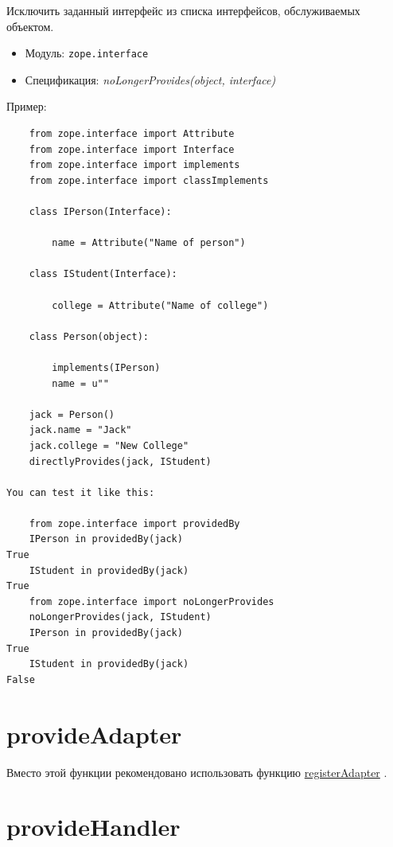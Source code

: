\documentclass[a4paper,openany,twoside,draft]{book}
\providecommand*{\DUroletitlereference}[1]{\textsl{#1}}
\begin{document}
Исключить заданный интерфейс из списка интерфейсов, обслуживаемых объектом.

\begin{itemize}

\item Модуль: \texttt{zope.interface}

\item Спецификация: \DUroletitlereference{noLongerProvides(object, interface)}

\end{itemize}

Пример:

\begin{verbatim}
    from zope.interface import Attribute
    from zope.interface import Interface
    from zope.interface import implements
    from zope.interface import classImplements

    class IPerson(Interface):

        name = Attribute("Name of person")

    class IStudent(Interface):

        college = Attribute("Name of college")

    class Person(object):

        implements(IPerson)
        name = u""

    jack = Person()
    jack.name = "Jack"
    jack.college = "New College"
    directlyProvides(jack, IStudent)

You can test it like this:

    from zope.interface import providedBy
    IPerson in providedBy(jack)
True
    IStudent in providedBy(jack)
True
    from zope.interface import noLongerProvides
    noLongerProvides(jack, IStudent)
    IPerson in providedBy(jack)
True
    IStudent in providedBy(jack)
False
\end{verbatim}


\section*{provideAdapter%
  \label{provideadapter}%
}

Вместо этой функции рекомендовано использовать функцию \hyperref[registeradapter]{registerAdapter} .


\section*{provideHandler%
  \label{providehandler}%
}
\end{document}
